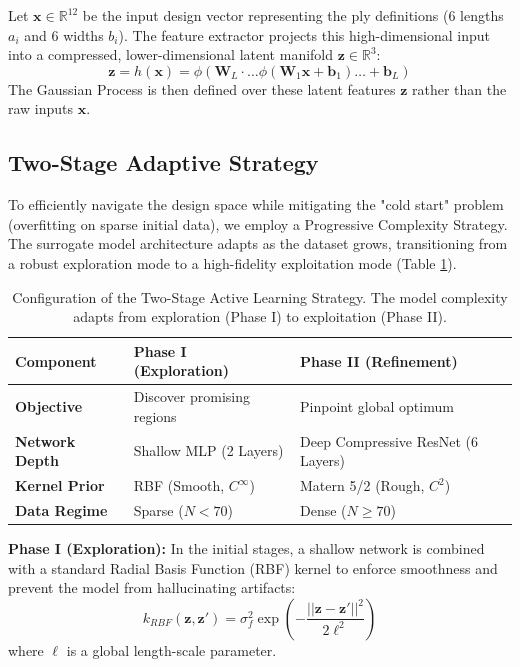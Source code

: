 \documentclass[
  preprint,
  12pt,
  a4paper
]{elsarticle}
\begin{document}
Let $\mathbf{x} \in \mathbb{R}^{12}$ be the input design vector representing the ply definitions (6 lengths $a_i$ and 6 widths $b_i$). The feature extractor projects this high-dimensional input into a compressed, lower-dimensional latent manifold $\mathbf{z} \in \mathbb{R}^3$:
\begin{equation}
    \mathbf{z} = h(\mathbf{x}) = \phi(\mathbf{W}_L \cdot \dots \phi(\mathbf{W}_1 \mathbf{x} + \mathbf{b}_1) \dots + \mathbf{b}_L)
\end{equation}
The Gaussian Process is then defined over these latent features $\mathbf{z}$ rather than the raw inputs $\mathbf{x}$.

\subsection{Two-Stage Adaptive Strategy}
\label{sec:two_stage}
To efficiently navigate the design space while mitigating the "cold start" problem (overfitting on sparse initial data), we employ a Progressive Complexity Strategy. The surrogate model architecture adapts as the dataset grows, transitioning from a robust exploration mode to a high-fidelity exploitation mode (Table \ref{tab:phases}).

\begin{table}[htbp]
    \centering
    \caption{Configuration of the Two-Stage Active Learning Strategy. The model complexity adapts from exploration (Phase I) to exploitation (Phase II).}
    \label{tab:phases}
    \begin{tabular}{l l l}
        \toprule
        \textbf{Component} & \textbf{Phase I (Exploration)} & \textbf{Phase II (Refinement)} \\
        \midrule
        \textbf{Objective} & Discover promising regions & Pinpoint global optimum \\
        \textbf{Network Depth} & Shallow MLP (2 Layers) & Deep Compressive ResNet (6 Layers) \\
        \textbf{Kernel Prior} & RBF (Smooth, $C^\infty$) & Matern 5/2 (Rough, $C^2$) \\
        \textbf{Data Regime} & Sparse ($N < 70$) & Dense ($N \geq 70$) \\
        \bottomrule
    \end{tabular}
\end{table}

\textbf{Phase I (Exploration):} In the initial stages, a shallow network is combined with a standard Radial Basis Function (RBF) kernel to enforce smoothness and prevent the model from hallucinating artifacts:
\begin{equation}
    k_{RBF}(\mathbf{z}, \mathbf{z}') = \sigma_f^2 \exp\left( - \frac{||\mathbf{z} - \mathbf{z}'||^2}{2\ell^2} \right)
\end{equation}
where $\ell$ is a global length-scale parameter.
\end{document}
